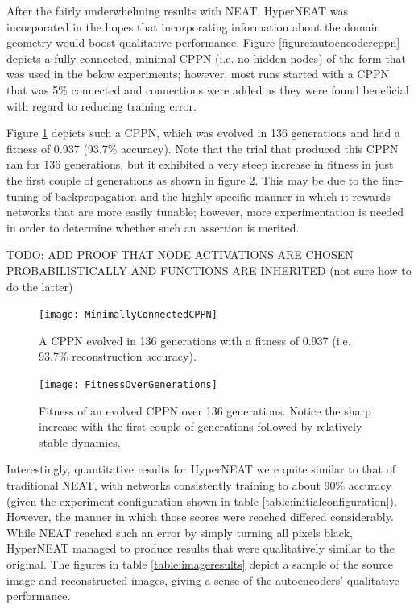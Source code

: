 \documentclass{acm_proc_article-sp}
\begin{document}
After the fairly underwhelming results with NEAT, HyperNEAT was incorporated in the hopes that incorporating information about the domain geometry would boost qualitative performance.  Figure \ref{figure:autoencodercppn} depicts a fully connected, minimal CPPN (i.e. no hidden nodes) of the form that was used in the below experiments; however, most runs started with a CPPN that was 5\% connected and connections were added as they were found beneficial with regard to reducing training error.  

Figure \ref{figure:minimallyconnectedcppn} depicts such a CPPN, which was evolved in 136 generations and had a fitness of 0.937 (93.7\% accuracy).  Note that the trial that produced this CPPN ran for 136 generations, but it exhibited a very steep increase in fitness in just the first couple of generations as shown in figure \ref{figure:fitnessovergenerations}.  This may be due to the fine-tuning of backpropagation and the highly specific manner in which it rewards networks that are more easily tunable; however, more experimentation is needed in order to determine whether such an assertion is merited.

TODO: ADD PROOF THAT NODE ACTIVATIONS ARE CHOSEN PROBABILISTICALLY AND FUNCTIONS ARE INHERITED (not sure how to do the latter)

\begin{figure}[h]
	\caption{A CPPN evolved in 136 generations with a fitness of 0.937 (i.e. 93.7\% reconstruction accuracy).}
	\centering
	\texttt{[image: MinimallyConnectedCPPN]}
	\label{figure:minimallyconnectedcppn}
\end{figure}

\begin{figure}[h]
	\caption{Fitness of an evolved CPPN over 136 generations.  Notice the sharp increase with the first couple of generations followed by relatively stable dynamics.}
	\centering
	\texttt{[image: FitnessOverGenerations]}
	\label{figure:fitnessovergenerations}
\end{figure}

Interestingly, quantitative results for HyperNEAT were quite similar to that of traditional NEAT, with networks consistently training to about 90\% accuracy (given the experiment configuration shown in table \ref{table:initialconfiguration}). However, the manner in which those scores were reached differed considerably.  While NEAT reached such an error by simply turning all pixels black, HyperNEAT managed to produce results that were qualitatively similar to the original.  The figures in table \ref{table:imageresults} depict a sample of the source image and reconstructed images, giving a sense of the autoencoders' qualitative performance.
\end{document}
